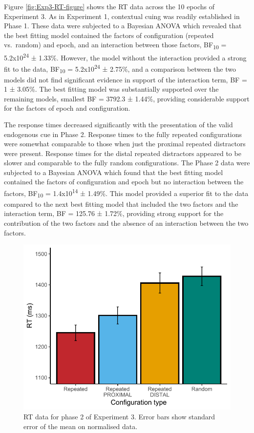 \documentclass[
  man,floatsintext]{apa7}
\begin{document}
Figure \ref{fig:Exp3-RT-figure} shows the RT data across the 10 epochs of Experiment 3. As in Experiment 1, contextual cuing was readily established in Phase 1. These data were subjected to a Bayesian ANOVA which revealed that the best fitting model contained the factors of configuration (repeated vs.~random) and epoch, and an interaction between those factors, BF\textsubscript{10} = 5.2x10\textsuperscript{24} ± 1.33\%. However, the model without the interaction provided a strong fit to the data, BF\textsubscript{10} = 5.2x10\textsuperscript{24} ± 2.75\%, and a comparison between the two models did not find significant evidence in support of the interaction term, BF = 1 ± 3.05\%. The best fitting model was substantially supported over the remaining models, smallest BF = 3792.3 ± 1.44\%, providing considerable support for the factors of epoch and configuration.

The response times decreased significantly with the presentation of the valid endogenous cue in Phase 2. Response times to the fully repeated configurations were somewhat comparable to those when just the proximal repeated distractors were present. Response times for the distal repeated distractors appeared to be slower and comparable to the fully random configurations. The Phase 2 data were subjected to a Bayesian ANOVA which found that the best fitting model contained the factors of configuration and epoch but no interaction between the factors, BF\textsubscript{10} = 1.4x10\textsuperscript{14} ± 1.49\%. This model provided a superior fit to the data compared to the next best fitting model that included the two factors and the interaction term, BF = 125.76 ± 1.72\%, providing strong support for the contribution of the two factors and the absence of an interaction between the two factors.

\begin{figure}

{\centering \includegraphics{CCC_ms1_files/figure-latex/Exp3-Phase-2-figure-1} 

}

\caption{RT data for phase 2 of Experiment 3. Error bars show standard error of the mean on normalised data.}\label{fig:Exp3-Phase-2-figure}
\end{figure}
\end{document}
